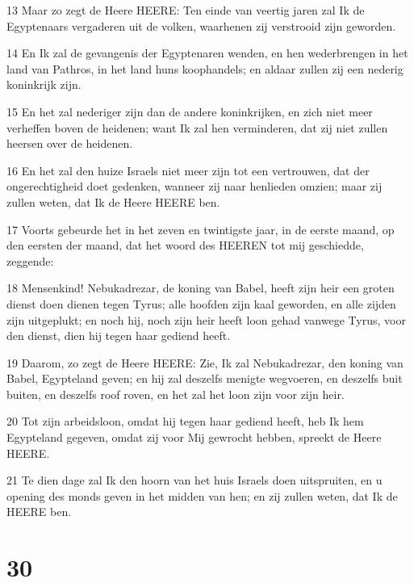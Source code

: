 \par 13 Maar zo zegt de Heere HEERE: Ten einde van veertig jaren zal Ik de Egyptenaars vergaderen uit de volken, waarhenen zij verstrooid zijn geworden.
\par 14 En Ik zal de gevangenis der Egyptenaren wenden, en hen wederbrengen in het land van Pathros, in het land huns koophandels; en aldaar zullen zij een nederig koninkrijk zijn.
\par 15 En het zal nederiger zijn dan de andere koninkrijken, en zich niet meer verheffen boven de heidenen; want Ik zal hen verminderen, dat zij niet zullen heersen over de heidenen.
\par 16 En het zal den huize Israels niet meer zijn tot een vertrouwen, dat der ongerechtigheid doet gedenken, wanneer zij naar henlieden omzien; maar zij zullen weten, dat Ik de Heere HEERE ben.
\par 17 Voorts gebeurde het in het zeven en twintigste jaar, in de eerste maand, op den eersten der maand, dat het woord des HEEREN tot mij geschiedde, zeggende:
\par 18 Mensenkind! Nebukadrezar, de koning van Babel, heeft zijn heir een groten dienst doen dienen tegen Tyrus; alle hoofden zijn kaal geworden, en alle zijden zijn uitgeplukt; en noch hij, noch zijn heir heeft loon gehad vanwege Tyrus, voor den dienst, dien hij tegen haar gediend heeft.
\par 19 Daarom, zo zegt de Heere HEERE: Zie, Ik zal Nebukadrezar, den koning van Babel, Egypteland geven; en hij zal deszelfs menigte wegvoeren, en deszelfs buit buiten, en deszelfs roof roven, en het zal het loon zijn voor zijn heir.
\par 20 Tot zijn arbeidsloon, omdat hij tegen haar gediend heeft, heb Ik hem Egypteland gegeven, omdat zij voor Mij gewrocht hebben, spreekt de Heere HEERE.
\par 21 Te dien dage zal Ik den hoorn van het huis Israels doen uitspruiten, en u opening des monds geven in het midden van hen; en zij zullen weten, dat Ik de HEERE ben.

\chapter{30}


